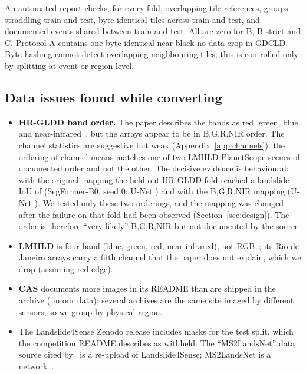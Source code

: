 \documentclass[11pt]{article}
\newcommand{\iou}{IoU}
\begin{document}
\begin{table}[t]\centering\small

\caption{Source datasets of the training tiles in each fold. Under B-strict only LMHLD and CAS contribute.}\label{tab:composition}
\end{table}

An automated report checks, for every fold, overlapping tile references, groups straddling train and test, byte-identical tiles across train and test, and documented events shared between train and test. All are zero for B, B-strict and C. Protocol A contains one byte-identical near-black no-data crop in GDCLD. Byte hashing cannot detect overlapping neighbouring tiles; this is controlled only by splitting at event or region level.

\subsection{Data issues found while converting}\label{sec:dataissues}
\begin{itemize}\setlength\itemsep{0pt}
\item \textbf{HR-GLDD band order.} The paper describes the bands as red, green, blue and near-infrared~\cite{meena2023hrgldd}, but the arrays appear to be in B,G,R,NIR order. The channel statistics are suggestive but weak (Appendix~\ref{app:channels}): the ordering of channel means matches one of two LMHLD PlanetScope scenes of documented order and not the other. The decisive evidence is behavioural: with the original mapping the held-out HR-GLDD fold reached a landslide \iou{} of \OldOrderSegIouHrgZ{} (SegFormer-B0, seed 0; U-Net \OldOrderUnetIouHrgZ{}) and with the B,G,R,NIR mapping \SegIouHrgZ{} (U-Net \UnetIouHrgZ{}). We tested only these two orderings, and the mapping was changed after the failure on that fold had been observed (Section~\ref{sec:design}). The order is therefore ``very likely'' B,G,R,NIR but not documented by the source.
\item \textbf{LMHLD} is four-band (blue, green, red, near-infrared), not RGB~\cite{liu2025lmhld}; its Rio de Janeiro arrays carry a fifth channel that the paper does not explain, which we drop (assuming red edge).
\item \textbf{CAS} documents more images in its README than are shipped in the archive (\TilesCas{} in our data); several archives are the same site imaged by different sensors, so we group by physical region.
\item The Landslide4Sense Zenodo release includes masks for the test split, which the competition README describes as withheld. The ``MS2LandsNet'' data source cited by~\cite{srivats2026} is a re-upload of Landslide4Sense; MS2LandsNet is a network~\cite{lu2024ms2}.
\end{itemize}
\end{document}
